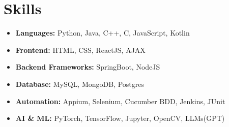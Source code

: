 \documentclass[letterpaper,11pt]{article}
\newcommand{\resumeItem}[1]{\item\small{{#1 \vspace{-2pt}}}}
\newcommand{\resumeSubHeadingListStart}{\begin{itemize}[leftmargin=0.15in, label={}]}
\newcommand{\resumeSubHeadingListEnd}{\end{itemize}}
\begin{document}
\section{\textbf{Skills}}
\resumeSubHeadingListStart
\resumeItem{\textbf{Languages:} Python, Java, C++, C, JavaScript, Kotlin}\vspace{-7pt}
\resumeItem{\textbf{Frontend:} HTML, CSS, ReactJS, AJAX}\vspace{-7pt}
\resumeItem{\textbf{Backend Frameworks:} SpringBoot, NodeJS}\vspace{-7pt}
\resumeItem{\textbf{Database:} MySQL, MongoDB, Postgres}\vspace{-7pt}
\resumeItem{\textbf{Automation:} Appium, Selenium, Cucumber BDD, Jenkins, JUnit}\vspace{-7pt}
\resumeItem{\textbf{AI \& ML:} PyTorch, TensorFlow, Jupyter, OpenCV, LLMs(GPT)}
\resumeSubHeadingListEnd
\vspace{-10pt}
\end{document}

